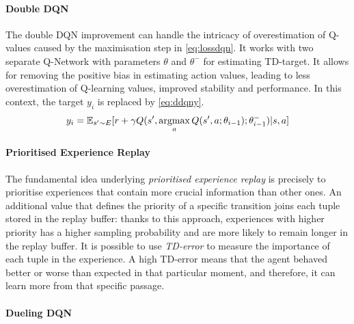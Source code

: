 \paragraph{Double DQN}
The double DQN \cite{hasselt2010double, van2016deep} improvement can handle the intricacy of overestimation of Q-values caused by the maximisation step in \vref{eq:lossdqn}. It works with two separate Q-Network with parameters $\theta$ and $\theta^-$ for estimating TD-target. It allows for removing the positive bias in estimating action values, leading to less overestimation of Q-learning values, improved stability and performance. In this context, the target $y_i$ is replaced by \vref{eq:ddqny}.
\begin{equation} \label{eq:ddqny}
y_i = \mathbb{E}_{s' \sim E}[r + \gamma Q(s',\operatornamewithlimits{argmax}_aQ(s', a; \theta_{i-1}); \theta^-_{i-1})|s,a]
\end{equation}
\paragraph{Prioritised Experience Replay}

The fundamental idea underlying \textit{prioritised experience replay} \cite{schaul2015prioritized} is precisely to prioritise experiences that contain more crucial information than other ones. An additional value that defines the priority of a specific transition joins each tuple stored in the replay buffer: thanks to this approach, experiences with higher priority has a higher sampling probability and are more likely to remain longer in the replay buffer. It is possible to use \textit{TD-error} to measure the importance of each tuple in the experience. A high TD-error means that the agent behaved better or worse than expected in that particular moment, and therefore, it can learn more from that specific passage.

\paragraph{Dueling DQN}

